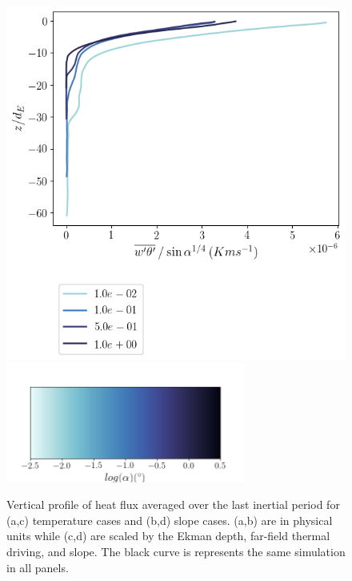 \documentclass[draft]{agujournal2019}
\begin{document}
\begin{figure}[h!]
\begin{minipage}{0.5\textwidth}
        \includegraphics[trim={0 4cm 0 0},clip,width=\textwidth]{Figures/heatflux_cmp_slope_46h_tav13_slopescale_z_profile.png}
        \centering \includegraphics[width=0.7\textwidth,trim={1cm 0cm 1cm 5cm}, clip]{Figures/colorbar_slope.png}
    \end{minipage}
    \caption{Vertical profile of heat flux averaged over the last inertial period for (a,c) temperature cases and (b,d) slope cases. (a,b) are in physical units while (c,d) are scaled by the Ekman depth, far-field thermal driving, and slope. The black curve is represents the same simulation in all panels.} 
    \label{fig:heatflux_profiles}
\end{figure}
\end{document}
